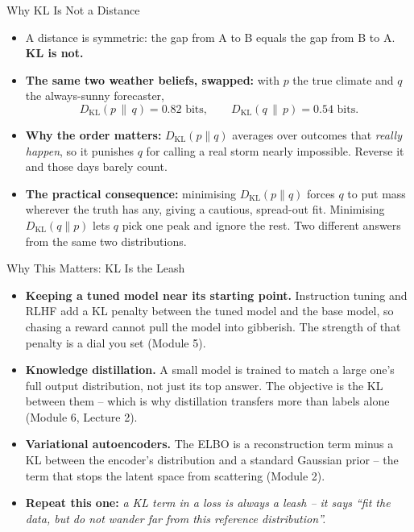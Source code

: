 \begin{frame}{Why KL Is Not a Distance}
\begin{itemize}
  \item A distance is symmetric: the gap from A to B equals the gap from B to A. \textbf{KL is not.}
  \pause
  \item \textbf{The same two weather beliefs, swapped:} with $p$ the true climate and $q$ the always-sunny forecaster,
  \[
    D_{\mathrm{KL}}(p \,\|\, q) = 0.82 \text{ bits}, \qquad
    D_{\mathrm{KL}}(q \,\|\, p) = 0.54 \text{ bits}.
  \]
  \pause
  \item \textbf{Why the order matters:} $D_{\mathrm{KL}}(p \| q)$ averages over outcomes that \emph{really happen}, so it punishes $q$ for calling a real storm nearly impossible. Reverse it and those days barely count.
  \pause
  \item \textbf{The practical consequence:} minimising $D_{\mathrm{KL}}(p \| q)$ forces $q$ to put mass wherever the truth has any, giving a cautious, spread-out fit. Minimising $D_{\mathrm{KL}}(q \| p)$ lets $q$ pick one peak and ignore the rest. Two different answers from the same two distributions.
\end{itemize}
\end{frame}

\begin{frame}{Why This Matters: KL Is the Leash}
\begin{itemize}
  \item \textbf{Keeping a tuned model near its starting point.} Instruction tuning and RLHF add a KL penalty between the tuned model and the base model, so chasing a reward cannot pull the model into gibberish. The strength of that penalty is a dial you set (Module 5).
  \pause
  \item \textbf{Knowledge distillation.} A small model is trained to match a large one's full output distribution, not just its top answer. The objective is the KL between them -- which is why distillation transfers more than labels alone (Module 6, Lecture 2).
  \pause
  \item \textbf{Variational autoencoders.} The ELBO is a reconstruction term minus a KL between the encoder's distribution and a standard Gaussian prior -- the term that stops the latent space from scattering (Module 2).
  \pause
  \item \textbf{Repeat this one:} \emph{a KL term in a loss is always a leash -- it says ``fit the data, but do not wander far from this reference distribution''.}
\end{itemize}
\end{frame}

